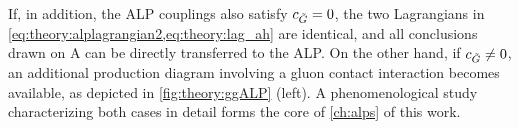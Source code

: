 If, in addition, the ALP couplings also satisfy $c_{\tilde{G}} = 0$, the two Lagrangians in \cref{eq:theory:alplagrangian2,eq:theory:lag_ah} are identical, and all conclusions drawn on A can be directly transferred to the ALP. On the other hand, if $c_{\tilde{G}} \neq 0$, an additional production diagram involving a gluon contact interaction becomes available, as depicted in \cref{fig:theory:ggALP} (left). A phenomenological study characterizing both cases in detail forms the core of \cref{ch:alps} of this work.

